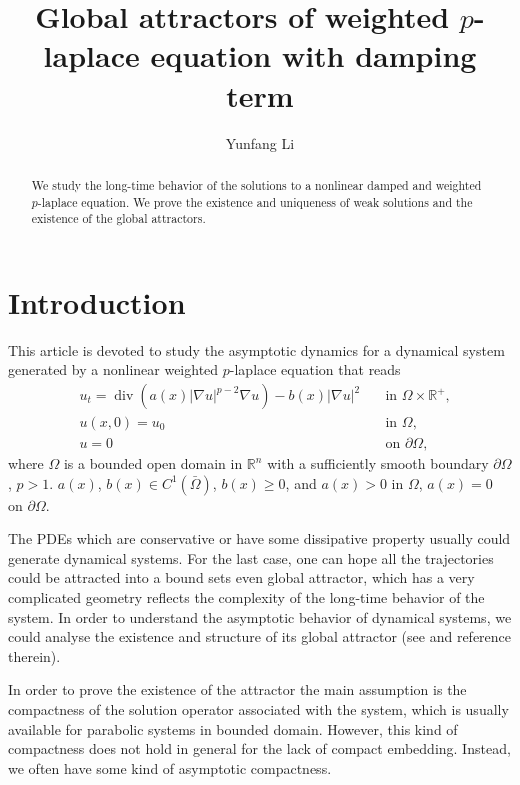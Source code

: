 \documentclass[11pt]{amsart}
\title[Attractor of $p$-laplace equation]{Global attractors of weighted $p$-laplace equation with damping term}
\author[Y. Li]{Yunfang Li}
\theoremstyle{definition}
\numberwithin{equation}{section}
\newcommand*\abs[1]{\lvert#1\rvert}
\newcommand\R{\mathbb{R}}
\DeclareMathOperator{\Div}{div}
\begin{document}
\begin{abstract}
	We study the long-time behavior of the solutions to a nonlinear damped and weighted $p$-laplace equation. We prove the
	existence and uniqueness of weak solutions and the existence
	of the global attractors.
\end{abstract}

\maketitle

\section{Introduction}
This article is devoted to study the asymptotic dynamics for a dynamical system generated by a nonlinear
weighted $p$-laplace equation that reads
\begin{equation}\label{eq:main}
\begin{alignedat}{2}
& u_t = \Div(a(x)\abs{\nabla u}^{p-2}\nabla u) - b(x)\abs{\nabla u}^2 \quad &\text{in } \Omega \times \R^+,\\
& u(x,0) = u_0 \quad &\text{in } \Omega,\\
& u = 0 \quad &\text{on } \partial\Omega,
\end{alignedat}
\end{equation}
where $\Omega$ is a bounded open domain in $\R^{n}$ with a sufficiently smooth boundary $\partial\Omega$, $p>1$.
$ a(x)$, $b(x) \in C^1(\bar{\Omega}) $, $b(x) \geq 0$, and $a(x) > 0$ in $\Omega$, $a(x) = 0$ on $\partial\Omega$.

The PDEs which are conservative or have some dissipative property
usually could generate dynamical systems. For the last case, one can
hope all the trajectories could be attracted into a bound sets even
global attractor, which has a very complicated geometry reflects the
complexity of the long-time behavior of the system. In order to
understand the asymptotic behavior of dynamical systems, we could
analyse the existence and structure of its global attractor
(see \autocite{cholewaGlobalAttractorsAbstract2000a,chueshovIntroductionTheoryInfinitedimensional2002,robinsonInfiniteDimensionalDynamicalSystems2001a,temamInfiniteDimensionalDynamicalSystems1997} and reference therein).

In order to prove the existence of the attractor the main assumption is
the compactness of the solution operator associated with the system,
which is usually available for parabolic systems in bounded domain.
However, this kind of compactness does not hold in general for the
lack of compact embedding. Instead, we often have some kind of
asymptotic compactness.
\end{document}
